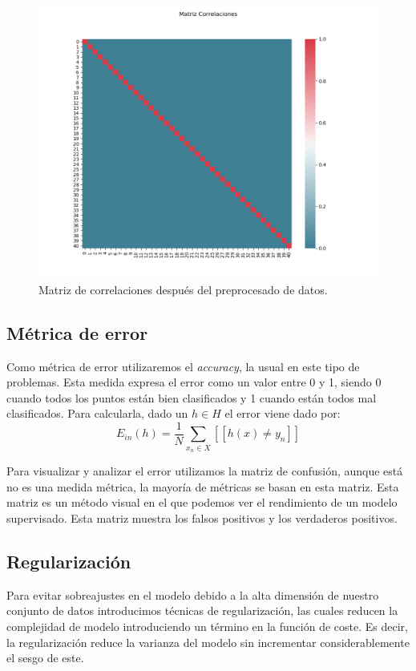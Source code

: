 \documentclass[size=a4, parskip=half, titlepage=false, toc=flat, toc=bib, 12pt]{scrartcl}
\begin{document}
\begin{figure}[H]
\centering
\includegraphics[width=1\textwidth]{./img/despuespre}
\caption{Matriz de correlaciones después del preprocesado de datos.}
\end{figure}

\subsection{Métrica de error}

Como métrica de error utilizaremos el \textit{accuracy}, la usual en este tipo de problemas. Esta medida expresa el error como un valor entre 0 y 1, siendo 0 cuando todos los puntos están bien clasificados y 1 cuando están todos mal clasificados. Para calcularla, dado un $h \in H$ el error viene dado por:
$$E_{in}(h) = \frac{1}{N} \sum_{x_n \in X} [[ h(x) \neq y_n]] $$

Para visualizar y analizar el error utilizamos la matriz de confusión, aunque está no es una medida métrica, la mayoría de métricas se basan en esta matriz. Esta matriz es un método visual en el que podemos ver el rendimiento de un modelo supervisado. Esta matriz muestra los falsos positivos y los verdaderos positivos.

\subsection{Regularización}

Para evitar sobreajustes en el modelo debido a la alta dimensión de nuestro conjunto de datos introducimos técnicas de regularización, las cuales reducen la complejidad de modelo introduciendo un término en la función de coste. Es decir, la regularización reduce la varianza del modelo sin incrementar considerablemente el sesgo de este.
\end{document}
